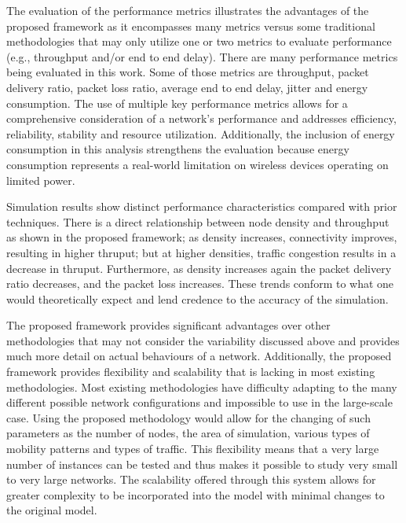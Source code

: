 \documentclass[a4paper,fleqn]{cas-dc}
\numberwithin{equation}{section}
\begin{document}
The evaluation of the performance metrics illustrates the advantages of the proposed framework as it encompasses many metrics versus some traditional methodologies that may only utilize one or two metrics to evaluate performance (e.g., throughput and/or end to end delay). There are many performance metrics being evaluated in this work. Some of those metrics are throughput, packet delivery ratio, packet loss ratio, average end to end delay, jitter and energy consumption. The use of multiple key performance metrics allows for a comprehensive consideration of a network's performance and addresses efficiency, reliability, stability and resource utilization. Additionally, the inclusion of energy consumption in this analysis strengthens the evaluation because energy consumption represents a real-world limitation on wireless devices operating on limited power. 

Simulation results show distinct performance characteristics compared with prior techniques. There is a direct relationship between node density and throughput as shown in the proposed framework; as density increases, connectivity improves, resulting in higher thruput; but at higher densities, traffic congestion results in a decrease in thruput. Furthermore, as density increases again the packet delivery ratio decreases, and the packet loss increases. These trends conform to what one would theoretically expect and lend credence to the accuracy of the simulation.

The proposed framework provides significant advantages over other methodologies that may not consider the variability discussed above and provides much more detail on actual behaviours of a network. Additionally, the proposed framework provides flexibility and scalability that is lacking in most existing methodologies. Most existing methodologies have difficulty adapting to the many different possible network configurations and impossible to use in the large-scale case. Using the proposed methodology would allow for the changing of such parameters as the number of nodes, the area of simulation, various types of mobility patterns and types of traffic. This flexibility means that a very large number of instances can be tested and thus makes it possible to study very small to very large networks. The scalability offered through this system allows for greater complexity to be incorporated into the model with minimal changes to the original model.
\end{document}
